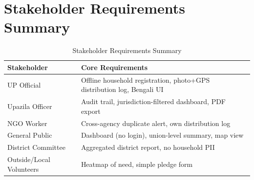 \section{Stakeholder Requirements Summary}
\begin{table}[H]
\centering
\caption{Stakeholder Requirements Summary}
\label{tab:stakeholder-reqs}
\begin{tabularx}{\textwidth}{@{}lX@{}}
\toprule
Stakeholder & Core Requirements \\
\midrule
UP Official & Offline household registration, photo+GPS distribution log, Bengali UI \\
Upazila Officer & Audit trail, jurisdiction-filtered dashboard, PDF export \\
NGO Worker & Cross-agency duplicate alert, own distribution log \\
General Public & Dashboard (no login), union-level summary, map view \\
District Committee & Aggregated district report, no household PII \\
Outside/Local Volunteers & Heatmap of need, simple pledge form \\
\bottomrule
\end{tabularx}
\end{table}
